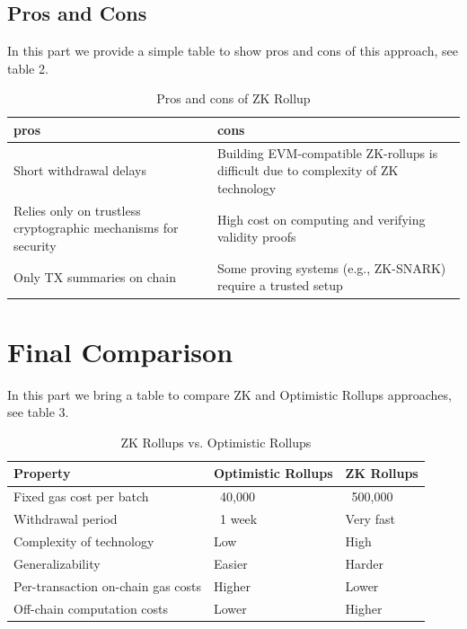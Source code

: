\subsection{Pros and Cons}
In this part we provide a simple table to show pros and cons of this approach, see table 2.
\begin{table}[htbp]
	\centering
	\captionsetup{justification=centering}
	\caption[position=above]{Pros and cons of ZK Rollup}
	\begin{tabular}{|>{\centering\arraybackslash}p{4cm}|>{\centering\arraybackslash}p{4cm}|}
		\hline
		\textbf{pros} & \textbf{cons}\\
		\hline
		Short withdrawal delays	& Building EVM-compatible ZK-rollups is difficult due to complexity of ZK technology \\
		\hline
		Relies only on trustless cryptographic mechanisms for security & High cost on computing and verifying validity proofs \\
		\hline
		Only TX summaries on chain & Some proving systems (e.g., ZK-SNARK) require a trusted setup \\
		\hline
	\end{tabular}
\end{table}
\section{Final Comparison}
In this part we bring a table to compare ZK and Optimistic Rollups approaches, see table 3.
\begin{table}[htbp]
	\centering
	\captionsetup{justification=centering}
	\caption[position=above]{ZK Rollups vs. Optimistic Rollups}
	\begin{tabular}{|>{\centering\arraybackslash}p{4cm}|>{\centering\arraybackslash}p{4cm}|>{\centering\arraybackslash}p{4cm}|}
		\hline
		\textbf{Property} & \textbf{Optimistic Rollups} & \textbf{ZK Rollups}\\
		\hline
		Fixed gas cost per batch & ~40,000 & ~500,000\\
		\hline
		Withdrawal period & ~1 week & Very fast \\
		\hline
		Complexity of technology & Low & High \\
		\hline
		Generalizability & Easier & Harder \\
		\hline
		Per-transaction on-chain gas costs & Higher & Lower \\
		\hline
		Off-chain computation costs & Lower & Higher \\
		\hline
	\end{tabular}
\end{table}
